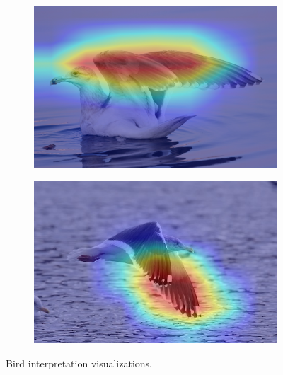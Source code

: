 \documentclass[a4paper,12pt]{report}
\begin{document}
\begin{figure}[htbp]
\begin{subfigure}[b]{0.22\textwidth}
        \caption{}
    \end{subfigure}
    \hfill
    \begin{subfigure}[b]{0.22\textwidth}
        \includegraphics[width=\textwidth]{images/interpretability/vgg/bird8.jpg}
        \caption{}
    \end{subfigure}
    \hfill
    \begin{subfigure}[b]{0.22\textwidth}
        \includegraphics[width=\textwidth]{images/interpretability/vgg/bird9.jpeg}
        \caption{}
    \end{subfigure}
    \caption{Bird interpretation visualizations.}
    \label{fig:bird-interpretability}
\end{figure}
\end{document}
